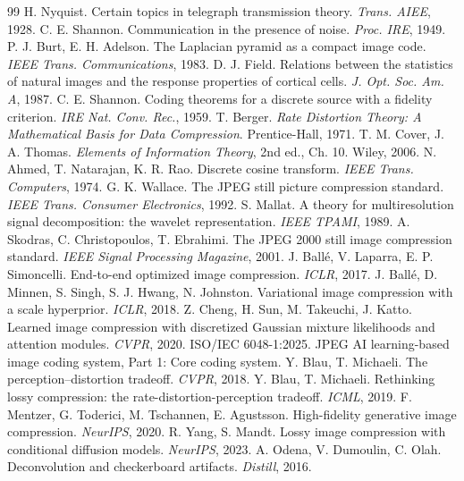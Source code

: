 \begin{thebibliography}{99}
   H. Nyquist. Certain topics in telegraph transmission theory. \emph{Trans. AIEE}, 1928.
   C. E. Shannon. Communication in the presence of noise. \emph{Proc. IRE}, 1949.
   P. J. Burt, E. H. Adelson. The Laplacian pyramid as a compact image code. \emph{IEEE Trans. Communications}, 1983.
   D. J. Field. Relations between the statistics of natural images and the response properties of cortical cells. \emph{J. Opt. Soc. Am. A}, 1987.
   C. E. Shannon. Coding theorems for a discrete source with a fidelity criterion. \emph{IRE Nat. Conv. Rec.}, 1959.
   T. Berger. \emph{Rate Distortion Theory: A Mathematical Basis for Data Compression}. Prentice-Hall, 1971.
   T. M. Cover, J. A. Thomas. \emph{Elements of Information Theory}, 2nd ed., Ch. 10. Wiley, 2006.
   N. Ahmed, T. Natarajan, K. R. Rao. Discrete cosine transform. \emph{IEEE Trans. Computers}, 1974.
   G. K. Wallace. The JPEG still picture compression standard. \emph{IEEE Trans. Consumer Electronics}, 1992.
   S. Mallat. A theory for multiresolution signal decomposition: the wavelet representation. \emph{IEEE TPAMI}, 1989.
   A. Skodras, C. Christopoulos, T. Ebrahimi. The JPEG 2000 still image compression standard. \emph{IEEE Signal Processing Magazine}, 2001.
   J. Ballé, V. Laparra, E. P. Simoncelli. End-to-end optimized image compression. \emph{ICLR}, 2017.
   J. Ballé, D. Minnen, S. Singh, S. J. Hwang, N. Johnston. Variational image compression with a scale hyperprior. \emph{ICLR}, 2018.
   Z. Cheng, H. Sun, M. Takeuchi, J. Katto. Learned image compression with discretized Gaussian mixture likelihoods and attention modules. \emph{CVPR}, 2020.
   ISO/IEC 6048-1:2025. JPEG AI learning-based image coding system, Part 1: Core coding system.
   Y. Blau, T. Michaeli. The perception--distortion tradeoff. \emph{CVPR}, 2018.
   Y. Blau, T. Michaeli. Rethinking lossy compression: the rate-distortion-perception tradeoff. \emph{ICML}, 2019.
   F. Mentzer, G. Toderici, M. Tschannen, E. Agustsson. High-fidelity generative image compression. \emph{NeurIPS}, 2020.
   R. Yang, S. Mandt. Lossy image compression with conditional diffusion models. \emph{NeurIPS}, 2023.
   A. Odena, V. Dumoulin, C. Olah. Deconvolution and checkerboard artifacts. \emph{Distill}, 2016.

\end{thebibliography}
